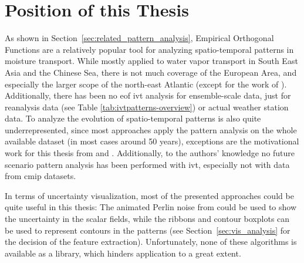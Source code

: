 \section{Position of this Thesis} %
\label{sec:Position of this Thesis}

As shown in Section~\ref{sec:related_pattern_analysis}, Empirical Orthogonal Functions are a relatively popular tool for analyzing spatio-temporal patterns in moisture transport. 
While mostly applied to water vapor transport in South East Asia and the Chinese Sea, there is not much coverage of the European Area, and especially the larger scope of the north-east Atlantic (except for the work of \citeauthor{wypych_atmospheric_2018} \cite{wypych_atmospheric_2018}). 
Additionally, there has been no \ac{eof} \ac{ivt} analysis for ensemble-scale data, just for reanalysis data (see Table \ref{tab:ivtpatterns-overview}) or actual weather station data.
To analyze the evolution of spatio-temporal patterns is also quite underrepresented, since most approaches apply the pattern analysis on the whole available dataset (in most cases around 50 years), exceptions are the motivational work for this thesis from  and . 
Additionally, to the authors' knowledge no future scenario pattern analysis has been performed with \ac{ivt}, especially not with data from \ac{cmip} datasets.  

In terms of uncertainty visualization, most of the presented approaches could be quite useful in this thesis: The animated Perlin noise from \cite{coninx_visualization_2011} could be used to show the uncertainty in the scalar fields, while the ribbons and contour boxplots can be used to represent contours in the patterns (see Section~\ref{sec:vis_analysis} for the decision of the feature extraction). 
Unfortunately, none of these algorithms is available as a library, which hinders application to a great extent. 


